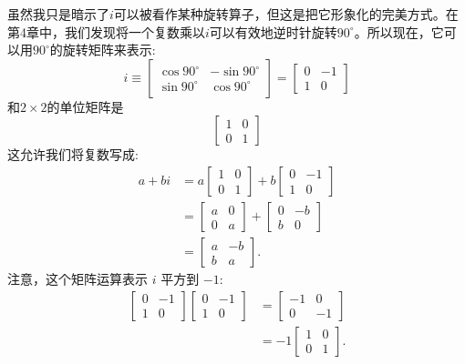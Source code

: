 虽然我只是暗示了$ i $可以被看作某种旋转算子，但这是把它形象化的完美方式。在第4章中，我们发现将一个复数乘以$i$可以有效地逆时针旋转$90^{\circ}$。所以现在，它可以用$90^{\circ}$的旋转矩阵来表示:
$$
  i \equiv\left[\begin{array}{cc}
      \cos 90^{\circ} & -\sin 90^{\circ} \\
      \sin 90^{\circ} & \cos 90^{\circ}
    \end{array}\right]=\left[\begin{array}{cc}
      0 & -1 \\
      1 & 0
    \end{array}\right]
$$
和$2 \times 2$的单位矩阵是
$$
  \left[\begin{array}{ll}
      1 & 0 \\
      0 & 1
    \end{array}\right]
$$
这允许我们将复数写成:
$$
  \begin{aligned}
    a+b i & =a\left[\begin{array}{ll}
        1 & 0 \\
        0 & 1
      \end{array}\right]+b\left[\begin{array}{cc}
        0 & -1 \\
        1 & 0
      \end{array}\right] \\
          & =\left[\begin{array}{ll}
        a & 0 \\
        0 & a
      \end{array}\right]+\left[\begin{array}{cc}
        0 & -b \\
        b & 0
      \end{array}\right]   \\
          & =\left[\begin{array}{cc}
        a & -b \\
        b & a
      \end{array}\right] .
  \end{aligned}
$$
注意，这个矩阵运算表示 $i$ 平方到 $-1$:
$$
  \begin{aligned}
    {\left[\begin{array}{cc}
          0 & -1 \\
          1 & 0
        \end{array}\right]\left[\begin{array}{cc}
          0 & -1 \\
          1 & 0
        \end{array}\right] } & =\left[\begin{array}{cc}
        -1 & 0  \\
        0  & -1
      \end{array}\right]     \\
                                                                                      & =-1\left[\begin{array}{ll}
        1 & 0 \\
        0 & 1
      \end{array}\right] .
  \end{aligned}
$$


